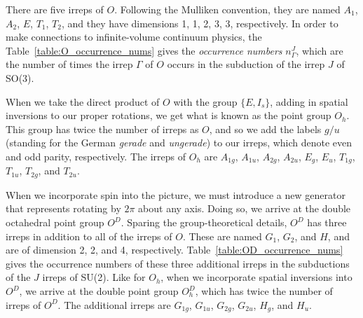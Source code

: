     There are five irreps of $O$. Following the Mulliken convention, they are named $A_1$, $A_2$, $E$, $T_1$, $T_2$, and they have dimensions 1, 1, 2, 3, 3, respectively. In order to make connections to infinite-volume continuum physics, the Table~\ref{table:O_occurrence_nums} gives the \emph{occurrence numbers} $n_\Gamma^J$, which are the number of times the irrep $\Gamma$ of $O$ occurs in the subduction of the irrep $J$ of SO(3).

    When we take the direct product of $O$ with the group $\lbrace E,I_s \rbrace$, adding in spatial inversions to our proper rotations, we get what is known as the point group $O_h$. This group has twice the number of irreps as $O$, and so we add the labels $g/u$ (standing for the German \emph{gerade} and \emph{ungerade}) to our irreps, which denote even and odd parity, respectively. The irreps of $O_h$ are $A_{1g}$, $A_{1u}$, $A_{2g}$, $A_{2u}$, $E_g$, $E_u$, $T_{1g}$, $T_{1u}$, $T_{2g}$, and $T_{2u}$.

    When we incorporate spin into the picture, we must introduce a new generator that represents rotating by $2\pi$ about any axis. Doing so, we arrive at the double octahedral point group $O^D$. Sparing the group-theoretical details, $O^D$ has three irreps in addition to all of the irreps of $O$. These are named $G_1$, $G_2$, and $H$, and are of dimension 2, 2, and 4, respectively. Table~\ref{table:OD_occurrence_nums} gives the occurrence numbers of these three additional irreps in the subductions of the $J$ irreps of SU(2). Like for $O_h$, when we incorporate spatial inversions into $O^D$, we arrive at the double point group $O_h^D$, which has twice the number of irreps of $O^D$. The additional irreps are $G_{1g}$, $G_{1u}$, $G_{2g}$, $G_{2u}$, $H_g$, and $H_u$.

